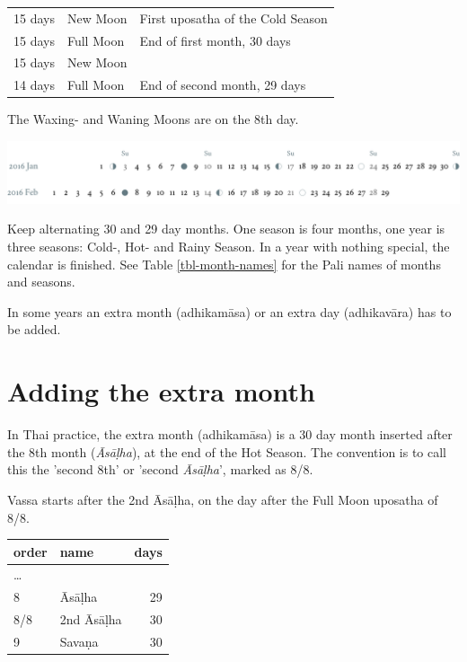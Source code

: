 \documentclass[11pt,oneside]{memoir-article}
\begin{document}
\begin{center}
\begin{tabular}{lll}
15 days & \GaNewmoon{} New Moon & First uposatha of the Cold Season\\
15 days & \GaFullmoon{} Full Moon & End of first month, 30 days\\
15 days & \GaNewmoon{} New Moon & \\
14 days & \GaFullmoon{} Full Moon & End of second month, 29 days\\
\end{tabular}
\end{center}

The \GaWaxingmoon{} Waxing- and \GaWaningmoon{} Waning Moons are on the 8th day.

\includegraphics[width=\linewidth]{two-months.pdf}

Keep alternating 30 and 29 day months. One season is four months, one
year is three seasons: Cold-, Hot- and Rainy Season. In a year with
nothing special, the calendar is finished. See Table \ref{tbl-month-names}
for the Pali names of months and seasons.

In some years an extra month (adhikamāsa) or an extra day
(adhikavāra) has to be added.

\section{Adding the extra month}
\label{sec-1-2}

In Thai practice, the extra month (adhikamāsa) is a 30 day month
inserted after the 8th month (\emph{Āsāḷha}), at the end of the Hot
Season. The convention is to call this the 'second 8th' or 'second
\emph{Āsāḷha}', marked as 8/8.

Vassa starts after the 2nd Āsāḷha, on the day after the Full Moon
uposatha of 8/8.

\begin{center}
\begin{tabular}{llr}
order & name & days\\
\hline
\ldots{} &  & \\
8 & Āsāḷha & 29\\
8/8 & 2nd Āsāḷha & 30\\
9 & Savaṇa & 30\\
\end{tabular}
\end{center}
\end{document}
